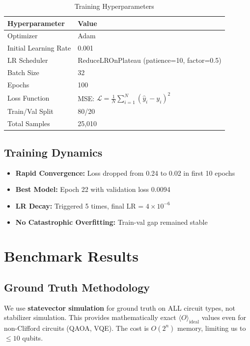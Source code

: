 \documentclass[11pt, a4paper]{article}
\begin{document}
\begin{table}[H]
\centering
\caption{Training Hyperparameters}
\begin{tabular}{@{}ll@{}}
\toprule
\textbf{Hyperparameter} & \textbf{Value} \\ \midrule
Optimizer & Adam \\
Initial Learning Rate & 0.001 \\
LR Scheduler & ReduceLROnPlateau (patience=10, factor=0.5) \\
Batch Size & 32 \\
Epochs & 100 \\
Loss Function & MSE: $\mathcal{L} = \frac{1}{N}\sum_{i=1}^{N}(\hat{y}_i - y_i)^2$ \\
Train/Val Split & 80/20 \\
Total Samples & 25,010 \\
\bottomrule
\end{tabular}
\end{table}

\subsection{Training Dynamics}

\begin{itemize}
    \item \textbf{Rapid Convergence:} Loss dropped from 0.24 to 0.02 in first 10 epochs
    \item \textbf{Best Model:} Epoch 22 with validation loss 0.0094
    \item \textbf{LR Decay:} Triggered 5 times, final LR = $4 \times 10^{-6}$
    \item \textbf{No Catastrophic Overfitting:} Train-val gap remained stable
\end{itemize}

\section{Benchmark Results}
\label{sec:results}

\subsection{Ground Truth Methodology}

\begin{keyinsight}
We use \textbf{statevector simulation} for ground truth on ALL circuit types,
not stabilizer simulation. This provides mathematically exact
$\langle O \rangle_{\text{ideal}}$ values even for non-Clifford circuits
(QAOA, VQE). The cost is $O(2^n)$ memory, limiting us to $\leq 10$ qubits.
\end{keyinsight}
\end{document}

